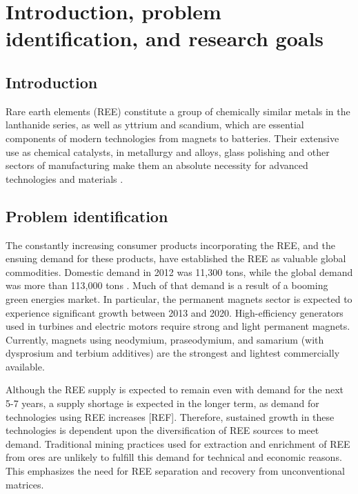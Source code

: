 \chapter{Introduction, problem identification, and research goals}

\clearpage

\section{Introduction}

Rare earth elements (REE) constitute a group of chemically similar metals in the lanthanide series, as well as yttrium and scandium, which are essential components of modern technologies from magnets to batteries.
Their extensive use as chemical catalysts, in metallurgy and alloys, glass polishing and other sectors of manufacturing make them an absolute necessity for advanced technologies and materials \citep{USGS_commsumm}.

\section{Problem identification}

The constantly increasing consumer products incorporating the REE, and the ensuing demand for these products, have established the REE as valuable global commodities.
Domestic demand in 2012 was 11,300 tons, while the global demand was more than 113,000 tons \citep{FrostSullivan_REEmarket}.
Much of that demand is a result of a booming green energies market.
In particular, the permanent magnets sector is expected to experience significant growth between 2013 and 2020.
High-efficiency generators used in turbines and electric motors require strong and light permanent magnets.
Currently, magnets using neodymium, praseodymium, and samarium (with dysprosium and terbium additives) are the strongest and lightest commercially available.


Although the REE supply is expected to remain even with demand for the next 5-7 years, a supply shortage is expected in the longer term, as demand for technologies using REE increases [REF].
Therefore, sustained growth in these technologies is dependent upon the diversification of REE sources to meet demand.
Traditional mining practices used for extraction and enrichment of REE from ores are unlikely to fulfill this demand for technical and economic reasons.
This emphasizes the need for REE separation and recovery from unconventional matrices.

